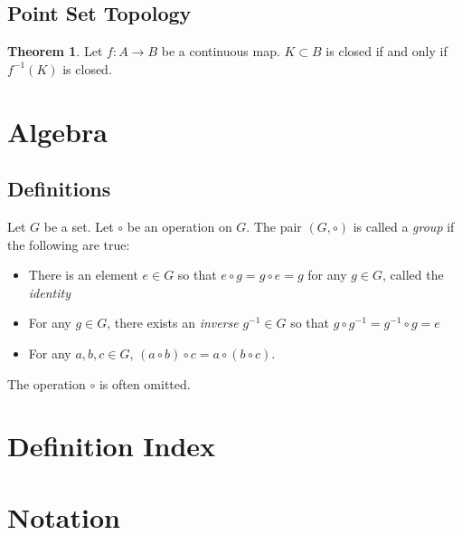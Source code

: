\documentclass{article}
\theoremstyle{definition}
\theoremstyle{theorem}
\newtheorem{theorem}{Theorem}[subsection]
\begin{document}
\subsection{Point Set Topology}
\begin{theorem}
    Let $f:A\rightarrow B$ be a continuous map. $K\subset B$ is closed if and only if $f^{-1}(K)$ is closed.
\end{theorem}


\newpage
\section{Algebra}
\setcounter{subsection}{-1}
\subsection{Definitions}
    Let $G$ be a set. Let $\circ$ be an operation on $G$. The pair $(G,\circ)$ is called a \textit{group} if the following are true:
    \begin{itemize}
        \item There is an element $e \in G$ so that $e\circ g = g \circ e = g$ for any $g\in G$, called the \textit{identity}
        \item For any $g\in G$, there exists an \textit{inverse} $g^{-1}\in G$ so that $g\circ g^{-1}=g^{-1}\circ g = e$
        \item For any $a,b,c\in G$, $(a\circ b)\circ c=a\circ(b\circ c)$.
    \end{itemize}
    The operation $\circ$ is often omitted.
    


\newpage
\renewcommand{\appendixpagename}{Appendix}
\appendixpage
\appendix
\section{Definition Index}
\section{Notation}
\end{document}
